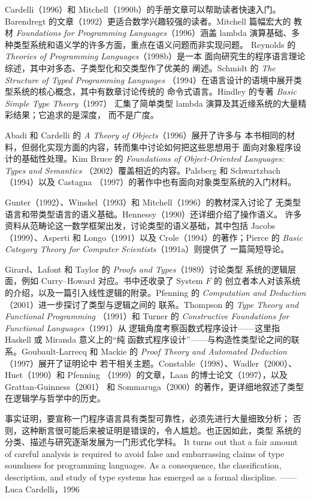 Cardelli（1996）和 Mitchell（1990b）的手册文章可以帮助读者快速入门。
Barendregt 的文章（1992）更适合数学兴趣较强的读者。Mitchell 篇幅宏大的
教材 \emph{Foundations for Programming Languages}（1996）涵盖 lambda
演算基础、多种类型系统和语义学的许多方面，重点在语义问题而非实现问题。
Reynolds 的 \emph{Theories of Programming Languages}（1998b）是一本
面向研究生的程序语言理论综述，其中对多态、子类型化和交类型作了优美的
阐述。Schmidt 的 \emph{The Structure of Typed Programming Languages}
（1994）在语言设计的语境中展开类型系统的核心概念，其中有数章讨论传统的
命令式语言。Hindley 的专著 \emph{Basic Simple Type Theory}（1997）
汇集了简单类型 lambda 演算及其近缘系统的大量精彩结果；它追求的是深度，
而不是广度。

Abadi 和 Cardelli 的 \emph{A Theory of Objects}（1996）展开了许多与
本书相同的材料，但弱化实现方面的内容，转而集中讨论如何把这些思想用于
面向对象程序设计的基础性处理。Kim Bruce 的
\emph{Foundations of Object-Oriented Languages: Types and Semantics}
（2002）覆盖相近的内容。Palsberg 和 Schwartzbach（1994）以及 Castagna
（1997）的著作中也有面向对象类型系统的入门材料。


Gunter（1992）、Winskel（1993）和 Mitchell（1996）的教材深入讨论了
无类型语言和带类型语言的语义基础。Hennessy（1990）还详细介绍了操作语义。
许多资料从范畴论这一数学框架出发，讨论类型的语义基础，其中包括 Jacobs
（1999）、Asperti 和 Longo（1991）以及 Crole（1994）的著作；Pierce 的
\emph{Basic Category Theory for Computer Scientists}（1991a）则提供了
一篇简短导论。

Girard、Lafont 和 Taylor 的 \emph{Proofs and Types}（1989）讨论类型
系统的逻辑层面，例如 Curry--Howard 对应。书中还收录了 System \(F\) 的
创立者本人对该系统的介绍，以及一篇引入线性逻辑的附录。Pfenning 的
\emph{Computation and Deduction}（2001）进一步探讨了类型与逻辑之间的
联系。Thompson 的 \emph{Type Theory and Functional Programming}
（1991）和 Turner 的
\emph{Constructive Foundations for Functional Languages}（1991）从
逻辑角度考察函数式程序设计——这里指 Haskell 或 Miranda 意义上的“纯
函数式程序设计”——与构造性类型论之间的联系。Goubault-Larrecq 和 Mackie
的 \emph{Proof Theory and Automated Deduction}（1997）展开了证明论中
若干相关主题。Constable（1998）、Wadler（2000）、Huet（1990）和 Pfenning
（1999）的文章，Laan 的博士论文（1997），以及 Grattan-Guinness（2001）
和 Sommaruga（2000）的著作，更详细地叙述了类型在逻辑学与哲学中的历史。

\bilingualepigraph
  {事实证明，要宣称一门程序语言具有类型可靠性，必须先进行大量细致分析；
   否则，这种断言很可能后来被证明是错误的，令人尴尬。也正因如此，类型
   系统的分类、描述与研究逐渐发展为一门形式化学科。}
  {It turns out that a fair amount of careful analysis is required to avoid
   false and embarrassing claims of type soundness for programming
   languages. As a consequence, the classification, description, and study
   of type systems has emerged as a formal discipline.}
  {——Luca Cardelli，1996}

